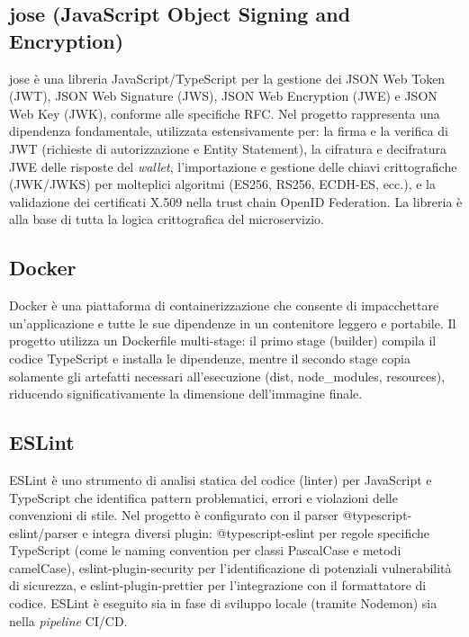 \subsection{jose (JavaScript Object Signing and Encryption)}
jose è una libreria JavaScript/TypeScript per la gestione dei JSON Web Token (JWT\glsfirstoccur{}), JSON Web Signature (JWS\glsfirstoccur{}), JSON Web Encryption (JWE\glsfirstoccur{}) e JSON Web Key (JWK\glsfirstoccur{}), conforme alle specifiche RFC. Nel progetto rappresenta una dipendenza fondamentale, utilizzata estensivamente per: la firma e la verifica di JWT (richieste di autorizzazione e Entity Statement), la cifratura e decifratura JWE delle risposte del \textit{wallet}, l'importazione e gestione delle chiavi crittografiche (JWK/JWKS) per molteplici algoritmi (ES256, RS256, ECDH-ES, ecc.), e la validazione dei certificati X.509 nella trust chain OpenID Federation. La libreria è alla base di tutta la logica crittografica del microservizio.

\subsection{Docker}
Docker è una piattaforma di containerizzazione che consente di impacchettare un'applicazione e tutte le sue dipendenze in un contenitore leggero e portabile. Il progetto utilizza un Dockerfile multi-stage: il primo stage (builder) compila il codice TypeScript e installa le dipendenze, mentre il secondo stage copia solamente gli artefatti necessari all'esecuzione (dist, node\_modules, resources), riducendo significativamente la dimensione dell'immagine finale.

\subsection{ESLint}
ESLint è uno strumento di analisi statica del codice (linter) per JavaScript e TypeScript che identifica pattern problematici, errori e violazioni delle convenzioni di stile. Nel progetto è configurato con il parser @typescript-eslint/parser e integra diversi plugin: @typescript-eslint per regole specifiche TypeScript (come le naming convention per classi PascalCase e metodi camelCase), eslint-plugin-security per l'identificazione di potenziali vulnerabilità di sicurezza, e eslint-plugin-prettier per l'integrazione con il formattatore di codice. ESLint è eseguito sia in fase di sviluppo locale (tramite Nodemon) sia nella \textit{pipeline} CI/CD\glsfirstoccur{}.

